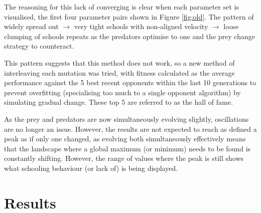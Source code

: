 \documentclass[12pt]{article}
\begin{document}
The reasoning for this lack of converging is clear when each parameter set is visualised, the first four parameter pairs shown in Figure \ref{fig:old}. The pattern of widely spread out $\xrightarrow{}$ very tight schools with non-aligned velocity $ \xrightarrow{}$ loose clumping of schools repeats as the predators optimise to one and the prey change strategy to counteract. \par
This pattern suggests that this method does not work, so a new method of interleaving each mutation was tried, with fitness calculated as the average performance against the 5 best recent opponents within the last 10 generations to prevent overfitting (specialising too much to a single opponent algorithm) by simulating gradual change. These top 5 are referred to as the hall of fame.\par
As the prey and predators are now simultaneously evolving slightly, oscillations are no longer an issue. However, the results are not expected to reach as defined a peak as if only one changed, as evolving both simultaneously effectively means that the landscape where a global maximum (or minimum) needs to be found is constantly shifting. However, the range of values where the peak is still shows what schooling behaviour (or lack of) is being displayed.
\section{Results}
\end{document}
